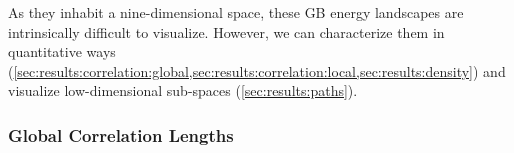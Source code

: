 \documentclass[final,twocolumn,12pt]{elsarticle}
\begin{document}
	As they inhabit a nine-dimensional space, these GB energy landscapes are intrinsically difficult to visualize. However, we can characterize them in quantitative ways (\cref{sec:results:correlation:global,sec:results:correlation:local,sec:results:density}) and visualize low-dimensional sub-spaces (\cref{sec:results:paths}).
	
	
	
	\subsubsection{Global Correlation Lengths} \label{sec:results:correlation:global}
	
\end{document}
